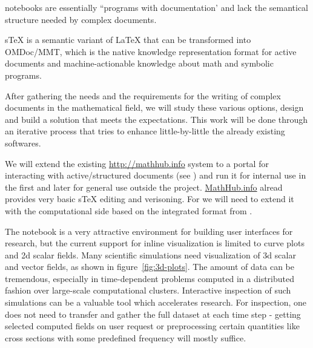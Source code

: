 \begin{workpackage}
\begin{tasklist}
\begin{task}[title=Structured documents,id=structdocs,lead=JU,PM=24,lead=JU,partners={SR,USH}]
\begin{compactitem}
  \item  \Jupyter notebooks are essentially ``programs with
    documentation' and lack the semantical structure needed by complex
    documents.

  \item  sTeX is a semantic variant of LaTeX that can be transformed into
    OMDoc/MMT, which is the native knowledge representation format for
    active documents and machine-actionable knowledge about math and
    symbolic programs.

  \end{compactitem}

  After gathering the needs and the requirements for the writing of complex
  documents in the mathematical field, we will study these various options,
  design and build a solution that meets the expectations. This work will be
  done through an iterative process that tries to enhance little-by-little the
  already existing softwares.

\end{task}

\begin{task}[id=mathhub,title=Active Documents Portal,lead=JU,PM=12]
  We will extend the existing \url{http://mathhub.info} system to a portal for
  interacting with active/structured documents (see ) and run it
  for internal use in the \TheProject first and later for general use outside the
  project. \url{MathHub.info} alread provides very basic sTeX editing and verisoning. For
  \TheProject we will need to extend it with the computational side based on the
  integrated format from .
\end{task}



\begin{task}[title=Visualization system for 3d data in web-notebook
, id=cfd-vis,lead=SR, partners={US,PS,USO}]

The \Jupyter notebook is a very attractive environment for building
user interfaces for research, but the current support for inline
visualization is limited to curve plots and 2d scalar fields. Many
scientific simulations need visualization of 3d scalar and vector
fields, as shown in figure~\ref{fig:3d-plots}. 
The amount of data can be tremendous, especially in
time-dependent problems computed in a distributed fashion over
large-scale computational clusters. Interactive inspection of such
simulations can be a valuable tool which accelerates research. For
inspection, one does not need to transfer and gather the full dataset
at each time step - getting selected computed fields on user request
or preprocessing certain quantities like cross sections with some
predefined frequency will mostly suffice.


\end{task}
\end{tasklist}
\end{workpackage}
